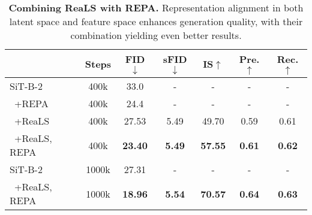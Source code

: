 \begin{table}[ht]
\centering
\setlength{\tabcolsep}{3.6pt}
\small %
\vskip -0.15in
\caption{\textbf{Combining ReaLS with REPA.} Representation alignment in both latent space and feature space enhances generation quality, with their combination yielding even better results.}
\begin{tabular}{lcccccc}
\toprule
       & Steps & FID$\downarrow$ & sFID$\downarrow$ & IS$\uparrow$ & Pre.$\uparrow$ & Rec.$\uparrow$ \\ \midrule
SiT-B-2 & 400k                & 33.0                    &     -                    &  -                     &  -                       & -                        \\
\ +REPA & 400k & 24.4  & -    & - & -     & -             \\
\ +ReaLS & 400k & 27.53          & 5.49            & 49.70         & 0.59            & 0.61           \\
\ +ReaLS, REPA & 400k & \textbf{23.40}          & \textbf{5.49}            & \textbf{57.55}         & \textbf{0.61}            & \textbf{0.62}           \\ \midrule
SiT-B-2 & 1000k                & 27.31                    &     -                    &  -                     &  -                       & -                        \\
\ +ReaLS, REPA & 1000k & \textbf{18.96}          & \textbf{5.54}            & \textbf{70.57}         & \textbf{0.64}            & \textbf{0.63} \\

\bottomrule
\end{tabular}
\label{repa}
\end{table}


